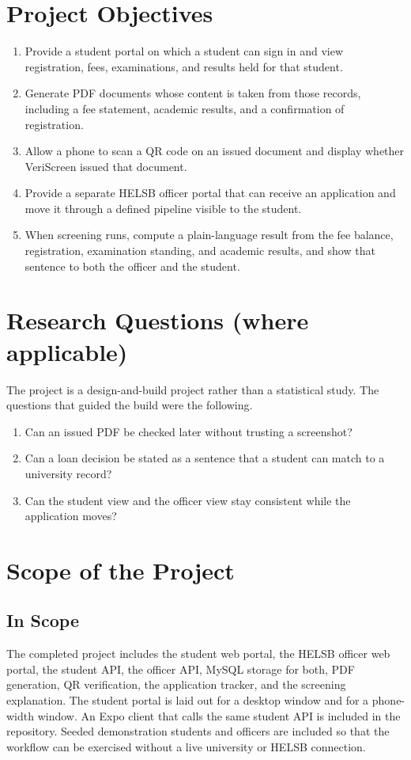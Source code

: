 \documentclass[12pt,a4paper]{report}
\begin{document}
\section{Project Objectives}
\begin{enumerate}
    \item Provide a student portal on which a student can sign in and view registration, fees, examinations, and results held for that student.
    \item Generate PDF documents whose content is taken from those records, including a fee statement, academic results, and a confirmation of registration.
    \item Allow a phone to scan a QR code on an issued document and display whether VeriScreen issued that document.
    \item Provide a separate HELSB officer portal that can receive an application and move it through a defined pipeline visible to the student.
    \item When screening runs, compute a plain-language result from the fee balance, registration, examination standing, and academic results, and show that sentence to both the officer and the student.
\end{enumerate}

\section{Research Questions (where applicable)}
The project is a design-and-build project rather than a statistical study. The questions that guided the build were the following.
\begin{enumerate}
    \item Can an issued PDF be checked later without trusting a screenshot?
    \item Can a loan decision be stated as a sentence that a student can match to a university record?
    \item Can the student view and the officer view stay consistent while the application moves?
\end{enumerate}

\section{Scope of the Project}
\subsection{In Scope}
The completed project includes the student web portal, the HELSB officer web portal, the student API, the officer API, MySQL storage for both, PDF generation, QR verification, the application tracker, and the screening explanation. The student portal is laid out for a desktop window and for a phone-width window. An Expo client that calls the same student API is included in the repository. Seeded demonstration students and officers are included so that the workflow can be exercised without a live university or HELSB connection.
\end{document}
